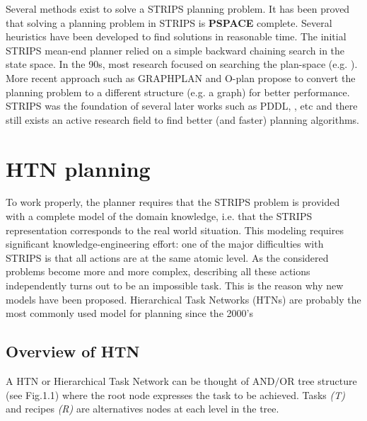 Several methods exist to solve a STRIPS planning problem. It has been proved \cite{bylander1994computational} that solving a planning problem in STRIPS is \textbf{PSPACE} complete. Several heuristics have been developed to find solutions in reasonable time. The initial STRIPS mean-end planner relied on a simple backward chaining search in the state space. In the 90s, most research focused on searching the plan-space (e.g. \cite{crainic2009models}). More recent approach such as GRAPHPLAN\cite{blum1997fast} and O-plan \cite{currie1991plan} propose to convert the planning problem to a different structure (e.g. a graph) for better performance. STRIPS was the foundation of several later works such as PDDL\cite{mcdermott1998pddl}, , etc and there still exists an active research field to find better (and faster) planning algorithms.
\section{HTN planning }
To work properly, the planner requires that the STRIPS problem is provided with a complete model of the domain knowledge, i.e. that the STRIPS representation corresponds to the real world situation. This modeling requires significant knowledge-engineering effort: one of the major difficulties with STRIPS is that all actions are at the same atomic level. As the considered problems become more and more complex, describing all these actions independently turns out to be an impossible task. This is the reason why new models have been proposed. Hierarchical Task Networks (HTNs) are probably the most commonly used model for planning since the 2000’s %
\subsection{Overview of HTN}
A HTN or Hierarchical Task Network can be thought of AND$/ $OR tree structure (see Fig.1.1) where the root node expresses the task to be achieved. Tasks \textit{(T)} and recipes \textit{(R)} are alternatives nodes at each level in the tree.



